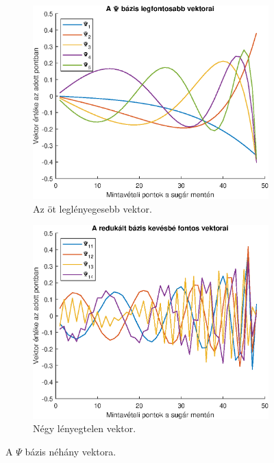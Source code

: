            \begin{figure}[h]
                \centering
                \begin{subfigure}{0.48\textwidth}
                    \includegraphics[width=\textwidth]{kep/euler_0.15_4_base_1_5.eps}
                    \caption{Az öt leglényegesebb vektor.}
                \end{subfigure}
                \begin{subfigure}{0.48\textwidth}
                    \includegraphics[width=\textwidth]{kep/euler_0.15_4_base_11_14.eps}
                    \caption{Négy lényegtelen vektor.}
                \end{subfigure}
                \caption{A $\Psi$ bázis néhány vektora.}
                \label{fig:bazis}
            \end{figure}
